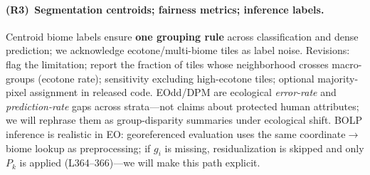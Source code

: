 \documentclass[10pt,twocolumn,letterpaper]{article}
\newcommand{\Rthree}{\textcolor{RthreeGreen}{\textbf{R3}}}
\begin{document}
{\begin{table}[h]
\centering
\vspace{-0.35em}
\caption{Comparison of mitigation baselines (ERM, BOLP, DBR, GroupDRO) on Prithvi-EO-2.0 (3 seeds).}
\label{tab:baselines}
\scriptsize
{}
\vspace{-0.75em}
\end{table}

\vspace{-0.28em}
\paragraph{(\Rthree)\, Segmentation centroids; fairness metrics; inference labels.}
Centroid biome labels ensure \textbf{one grouping rule} across classification and dense prediction; we acknowledge ecotone/multi-biome tiles as label noise. Revisions: flag the limitation; report the fraction of tiles whose neighborhood crosses macro-groups (ecotone rate); sensitivity excluding high-ecotone tiles; optional majority-pixel assignment in released code. EOdd/DPM are ecological \emph{error-rate} and \emph{prediction-rate} gaps across strata---not claims about protected human attributes; we will rephrase them as group-disparity summaries under ecological shift. BOLP inference is realistic in EO: georeferenced evaluation uses the same coordinate$\to$biome lookup as preprocessing; if $g_i$ is missing, residualization is skipped and only $P_k$ is applied (L364--366)---we will make this path explicit.

}
\end{document}
